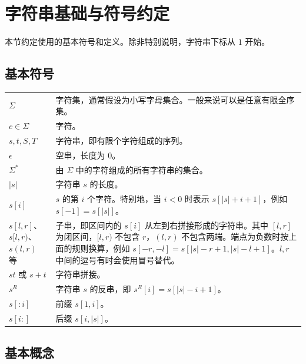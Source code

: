 \chapter{字符串基础与符号约定}

本节约定使用的基本符号和定义。除非特别说明，字符串下标从 $1$ 开始。

\section{基本符号}

\begin{center}
\renewcommand{\arraystretch}{1.25}
\begin{tabular}{p{}p{}}
$\Sigma$ & 字符集，通常假设为小写字母集合。一般来说可以是任意有限全序集。\\
$c\in \Sigma$ & 字符。\\
$s,t,S,T$ & 字符串，即有限个字符组成的序列。\\
$\epsilon$ & 空串，长度为 $0$。\\
$\Sigma^*$ & 由 $\Sigma$ 中的字符组成的所有字符串的集合。\\
$|s|$ & 字符串 $s$ 的长度。\\
$s[i]$ & $s$ 的第 $i$ 个字符。特别地，当 $i<0$ 时表示 $s[|s|+i+1]$，例如 $s[-1]=s[|s|]$。\\
$s[l,r]$、$s[l,r)$、$s(l,r)$ 等 & 子串，即区间内的 $s[i]$ 从左到右拼接形成的字符串。其中 $[l,r]$ 为闭区间，$[l,r)$ 不包含 $r$，$(l,r)$ 不包含两端。端点为负数时按上面的规则换算，例如 $s[-r,-l]=s[|s|-r+1,|s|-l+1]$。$l,r$ 中间的逗号有时会使用冒号替代。\\
$st$ 或 $s+t$ & 字符串拼接。\\
$s^R$ & 字符串 $s$ 的反串，即 $s^R[i]=s[|s|-i+1]$。\\
$s[:i]$ & 前缀 $s[1,i]$。\\
$s[i:]$ & 后缀 $s[i,|s|]$。\\
\end{tabular}
\end{center}

\section{基本概念}

